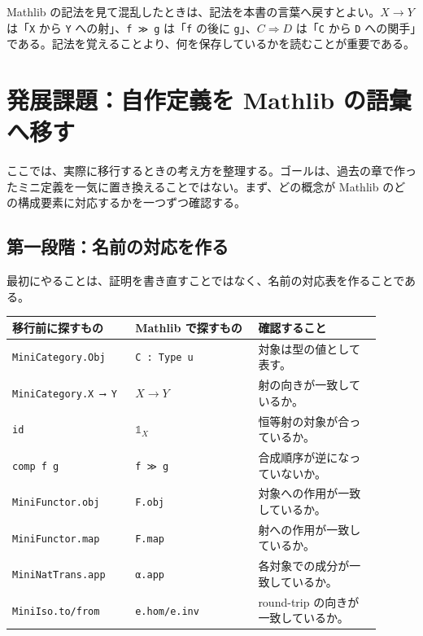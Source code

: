 \begin{warningbox}
Mathlib の記法を見て混乱したときは、記法を本書の言葉へ戻すとよい。\(X \longrightarrow Y\) は「\texttt{X} から \texttt{Y} への射」、\texttt{f ≫ g} は「\texttt{f} の後に \texttt{g}」、\(C \Rightarrow D\) は「\texttt{C} から \texttt{D} への関手」である。記法を覚えることより、何を保存しているかを読むことが重要である。
\end{warningbox}


\section{発展課題：自作定義を Mathlib の語彙へ移す}

ここでは、実際に移行するときの考え方を整理する。ゴールは、過去の章で作ったミニ定義を一気に置き換えることではない。まず、どの概念が Mathlib のどの構成要素に対応するかを一つずつ確認する。

\subsection{第一段階：名前の対応を作る}

最初にやることは、証明を書き直すことではなく、名前の対応表を作ることである。

\begin{longtable}{p{0.30\linewidth}p{0.30\linewidth}p{0.30\linewidth}}
\toprule
移行前に探すもの & Mathlib で探すもの & 確認すること \\
\midrule
\texttt{MiniCategory.Obj} & \texttt{C : Type u} & 対象は型の値として表す。 \\
\texttt{MiniCategory.X ⟶ Y} & \(X \longrightarrow Y\) & 射の向きが一致しているか。 \\
\texttt{id} & \(\mathbb{1}_X\) & 恒等射の対象が合っているか。 \\
\texttt{comp f g} & \texttt{f ≫ g} & 合成順序が逆になっていないか。 \\
\texttt{MiniFunctor.obj} & \texttt{F.obj} & 対象への作用が一致しているか。 \\
\texttt{MiniFunctor.map} & \texttt{F.map} & 射への作用が一致しているか。 \\
\texttt{MiniNatTrans.app} & \texttt{α.app} & 各対象での成分が一致しているか。 \\
\texttt{MiniIso.to/from} & \texttt{e.hom/e.inv} & round-trip の向きが一致しているか。 \\
\bottomrule
\end{longtable}

